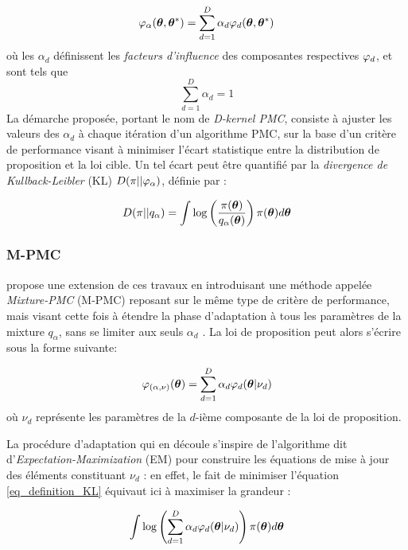 \begin{equation}
{\varphi}_\alpha({\bm{\theta}}, {{\bm{\theta}}^*}) = \sum\limits_{d=1}^D\alpha_d {\varphi}_d({\bm{\theta}}, {{\bm{\theta}}^*})
\label{eq_PMC_D_Kernel}
\end{equation}
où les $\alpha_d$ définissent les \textit{facteurs d'influence} des composantes respectives ${\varphi}_d$, et sont tels que $$\sum\limits_{d=1}^D \alpha_d = 1$$  La démarche proposée, portant le nom de \textit{D-kernel PMC}, consiste à ajuster les valeurs des $\alpha_d$ à chaque itération d'un algorithme PMC, sur la base d'un critère de performance visant à minimiser l'écart statistique entre la distribution de proposition et la loi cible. Un tel écart peut être quantifié par la \textit{divergence de Kullback-Leibler} (KL)  $D(\pi || {\varphi}_\alpha )$, définie par : 


\begin{equation}
D(\pi || q_\alpha ) = \int \log\left(\dfrac{\pi({\bm{\theta}})}{q_\alpha({\bm{\theta}})}\right)\pi({\bm{\theta}})d{\bm{\theta}}
\label{eq_definition_KL}
\end{equation}

\subsubsection{M-PMC}

\cite{Cappe2008} propose une extension de ces travaux en introduisant une méthode appelée \textit{Mixture-PMC} (M-PMC) reposant sur le même type de critère de performance, mais visant cette fois à étendre la phase d'adaptation à tous les paramètres de la mixture $q_{\alpha}$, sans se limiter aux seuls $\alpha_d$ . La loi de proposition peut alors s'écrire sous la forme suivante:

\begin{equation}
{\varphi}_{(\alpha,\nu)}({\bm{\theta}}) = \sum\limits_{d=1}^D\alpha_d {\varphi}_d({\bm{\theta}} |\nu_d)
\label{eq_M_PMC_kernel}
\end{equation}
où $\nu_d$ représente les paramètres de la $d$-ième composante de la loi de proposition.

La procédure d'adaptation qui en découle s'inspire de l'algorithme dit d'\textit{Expectation-Maximization} (EM) pour construire les équations de mise à jour des éléments constituant $\nu_d$ : en effet, le fait de minimiser l'équation \eqref{eq_definition_KL} équivaut ici  à maximiser la grandeur : 

\begin{equation}
\int \log\left(\sum\limits_{d=1}^D \alpha_d {\varphi}_d({\bm{\theta}}| \nu_d)\right)\pi({\bm{\theta}})d{\bm{\theta}}
\label{eq_KL_pour_EM}
\end{equation} 

